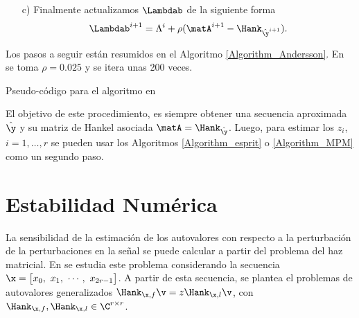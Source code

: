 \begin{itemize}
			\item[c)] Finalmente actualizamos $\Lambdab$ de la siguiente forma
				\begin{equation}
					\Lambdab^{i+1} = \Lambda^i + \rho(\matA^{i+1}-\Hank_{\hat{\y}^{i+1}}).
					\label{Eq:Andersson7}
				\end{equation}
		\end{itemize}

		Los pasos a seguir están resumidos en el Algoritmo \eqref{Algorithm_Andersson}. En \cite{Andersson2014} se toma $\rho = 0.025$ y se itera unas 200 veces. 

		\begin{algorithm}
			\caption{Pseudo-código para el algoritmo en \cite{Andersson2014}}
			\begin{algorithmic}[1]
				\EndWhile	
			\end{algorithmic}
			\label{Algorithm_Andersson}
		\end{algorithm} 

		El objetivo de este procedimiento, es siempre obtener una secuencia aproximada $\hat{\y}$ y su matriz de Hankel asociada $\matA = \Hank_{\hat{\y}}$. Luego, para estimar los $z_i$, $i=1,\ldots,r$ se pueden usar los Algoritmos \eqref{Algorithm_esprit} o \eqref{Algorithm_MPM} como un segundo paso.

	\section{Estabilidad Numérica}
	
		La sensibilidad de la estimación de los autovalores con respecto a la perturbación de la perturbaciones en la señal se puede calcular a partir del problema del haz matricial. En \cite{Golub1999, Beckermann2007} se estudia este problema considerando la secuencia $\x = \big[x_0,\ x_1,\ \cdots,\ x_{2r-1} \big]$. A partir de esta secuencia, se plantea el problemas de autovalores generalizados $\Hank_{\x,f}\v = z\Hank_{\x,l}\v$, con $\Hank_{\x,f},\Hank_{\x,l}\in\C^{r\times r}$.
		
